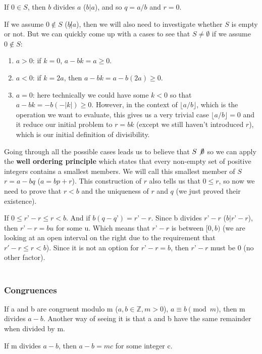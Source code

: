 If $0\in S$, then $b$ divides $a$ ($b|a$), and so $q = a/b$ and $r=0$.

If we assume $0\notin S$ ($b\not| a$), then we will also need to investigate whether $S$ is empty or not.
But we can quickly come up with a cases to see that $S \neq \emptyset$ if we assume $0\notin S$:
\begin{enumerate}
    \item $a>0$: if $k=0$, $a - bk = a\geq 0$.
    \item $a<0$: if $k = 2a$, then $a - bk = a - b(2a) \geq 0$.
    \item $a=0$: here technically we could have some $k<0$ so that $a - bk = -b(-|k|) \geq 0$. However,
    in the context of $\lfloor a/b \rfloor$, which is the operation we want to evaluate, this gives us a very
    trivial case $\lfloor a/b \rfloor = 0$ and it reduce our initial problem to $r = bk$ (except we still haven't
    introduced $r$), which is our initial definition of divisibility.
\end{enumerate}
Going through all the possible cases leads us to believe that $S\not \emptyset$
so we can apply the \textbf{well ordering principle} which states that every non-empty set of positive
integers contains a smallest members.
We will call this smallest member of $S$ $r = a - bq$ ($a = bp + r$).
This construction of $r$ also tells us that $0 \leq r$, so now we need to prove that $r < b$ and the
uniqueness of $r$ and $q$ (we just proved their existence).


If $0 \leq r’ - r \leq r < b$.
And if $b(q - q’) = r’ -r$. 
Since b divides $r’ - r$ ($b | r’-r$), then $r’-r = bu$ for some u.
Which means that $r’-r$ is between $[0, b)$ (we are looking at an open interval on the right due to the 
requirement that $r' - r \leq r < b$).
Since it is not an option for $r’ - r = b$, then $r’ - r$ must be 0 (no other factor). 
\\~\\



\subsubsection{Congruences}

If a and b are congruent modulo m ($a,b \in \mathbb{Z}, m >0$), $a \equiv b \pmod m$, then m divides $a-b$.
Another way of seeing it is that a and b have the same remainder when divided by m.

If m divides $a-b$, then $a-b = mc$ for some integer c.

